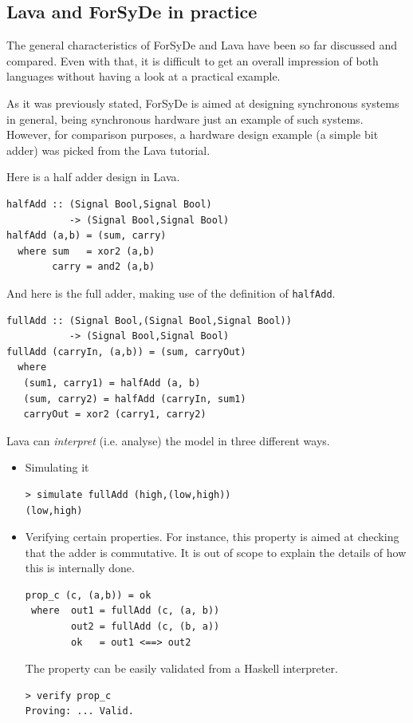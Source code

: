 \documentclass[a4paper,twoside,11pt]{article}
\begin{document}
\begin{body}
  \section{Lava and ForSyDe in practice}
  The general characteristics of ForSyDe and Lava have been so far
  discussed and compared. Even with that, it is difficult to get an
  overall impression of both languages without having a look at a
  practical example.
  
  As it was previously stated, ForSyDe is aimed at designing synchronous
  systems in general, being synchronous hardware just an example of such
  systems.  However, for comparison purposes, a hardware design example
  (a simple bit adder) was picked from the Lava tutorial\cite{lava:tutorial}.
  
  Here is a half adder design in Lava.
  
\begin{lstlisting}
halfAdd :: (Signal Bool,Signal Bool)  
           -> (Signal Bool,Signal Bool)
halfAdd (a,b) = (sum, carry)
  where sum   = xor2 (a,b)
        carry = and2 (a,b)
\end{lstlisting}

And here is the full adder, making use of the definition of \texttt{halfAdd}.

\begin{lstlisting}
fullAdd :: (Signal Bool,(Signal Bool,Signal Bool)) 
           -> (Signal Bool,Signal Bool)
fullAdd (carryIn, (a,b)) = (sum, carryOut)
  where
   (sum1, carry1) = halfAdd (a, b)
   (sum, carry2) = halfAdd (carryIn, sum1)
   carryOut = xor2 (carry1, carry2)
\end{lstlisting}

Lava can \textit{interpret} (i.e. analyse) the model in three
different ways.

\begin{itemize}
\item Simulating it

\begin{verbatim}
> simulate fullAdd (high,(low,high))
(low,high)
\end{verbatim}

\item Verifying certain properties. For instance, this property is
  aimed at checking that the adder is commutative. It is out of scope
  to explain the details of how this is internally done.
  
\begin{lstlisting}
prop_c (c, (a,b)) = ok
 where  out1 = fullAdd (c, (a, b))
        out2 = fullAdd (c, (b, a))
        ok   = out1 <==> out2
\end{lstlisting}
The property can be easily validated from a Haskell interpreter.
\begin{verbatim}
> verify prop_c
Proving: ... Valid.
\end{verbatim}


\end{itemize}
\end{body}
\end{document}
